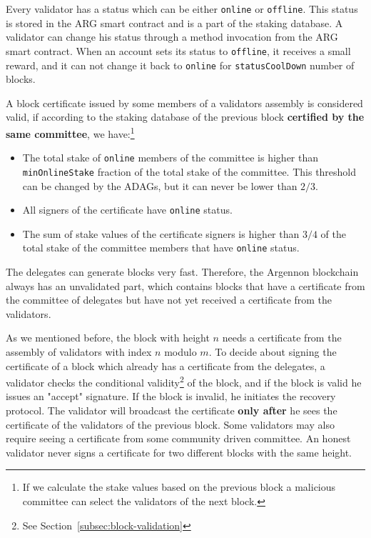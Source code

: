 Every validator has a status which can be either \texttt{online} or \texttt{offline}.
This status is stored in the ARG smart contract and is a part of the staking database. A validator can change
his status through a method invocation
from the ARG smart contract. When an account sets its status to \texttt{offline}, it receives a small reward, and
it can not change it back to \texttt{online} for \texttt{statusCoolDown} number of blocks.


A block certificate issued by some members of a validators assembly is considered valid, if according to
the staking database of the previous block \textbf{certified by the same committee}, we have:\footnote{If we calculate
the stake values based on the previous block a malicious committee can select the validators of the next block.}
\begin{itemize}
    \item The total stake of \texttt{online} members of the committee is higher than \texttt{minOnlineStake} fraction
    of the total stake of the committee. This threshold can be changed by the ADAGs, but it can never be lower
    than $2/3$.
    \item All signers of the certificate have \texttt{online} status.
    \item The sum of stake values of the certificate signers is higher than $3/4$ of the total stake
    of the committee members that have \texttt{online} status.
\end{itemize}

The delegates can generate blocks very fast. Therefore, the Argennon blockchain always has an
unvalidated part, which contains blocks that have a certificate from the committee of delegates but have not
yet received a certificate from the validators.

As we mentioned before, the block with height $n$ needs a certificate from the assembly of
validators with index $n$ modulo $m$. To decide about signing the certificate of a block which already has
a certificate from the delegates, a validator checks the conditional
validity\footnote{See Section~\ref{subsec:block-validation}} of the block, and
if the block is valid he issues
an "accept" signature. If the block is invalid, he initiates the recovery protocol. The validator will broadcast the
certificate \textbf{only after} he sees the certificate of the validators of the previous block.
Some validators may also require seeing a certificate from
some community driven committee. An honest validator never signs a certificate for two different blocks with the
same height.

